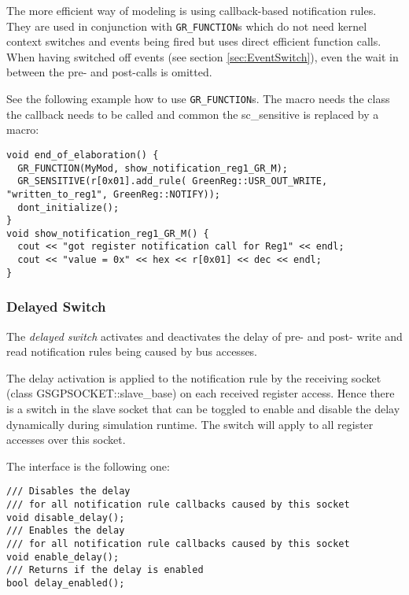 The more efficient way of modeling is using callback-based notification rules. They are used in conjunction with \lstinline|GR_FUNCTION|s which do not need kernel context switches and events being fired but uses direct efficient function calls. When having switched off events (see section \ref{sec:EventSwitch}), even the {\sffamily wait} in between the pre- and post-calls is omitted. 

See the following example how to use \lstinline|GR_FUNCTION|s. The macro needs the class the callback needs to be called and common the sc\_sensitive is replaced by a macro:
 
\noindent
\begin{minipage}{\textwidth}
\begin{lstlisting}
void end_of_elaboration() {
  GR_FUNCTION(MyMod, show_notification_reg1_GR_M);
  GR_SENSITIVE(r[0x01].add_rule( GreenReg::USR_OUT_WRITE, "written_to_reg1", GreenReg::NOTIFY));
  dont_initialize();
}
void show_notification_reg1_GR_M() {
  cout << "got register notification call for Reg1" << endl;
  cout << "value = 0x" << hex << r[0x01] << dec << endl;
}
\end{lstlisting}
\end{minipage}


\subsubsection{Delayed Switch}
\label{sec:DelayedSwitch}

The {\em delayed switch} activates and deactivates the delay of pre- and post- write and read notification rules being caused by bus accesses.

The delay activation is applied to the notification rule by the receiving socket (class \mbox{{\sffamily GSGPSOCKET::slave\_base})} on each received register access. Hence there is a switch in the slave socket that can be toggled to enable and disable the delay dynamically during simulation runtime. The switch will apply to all register accesses over this socket.

The interface is the following one:
\vspace{-1ex}
\begin{lstlisting}
/// Disables the delay 
/// for all notification rule callbacks caused by this socket
void disable_delay();
/// Enables the delay
/// for all notification rule callbacks caused by this socket
void enable_delay();
/// Returns if the delay is enabled
bool delay_enabled();
\end{lstlisting}

